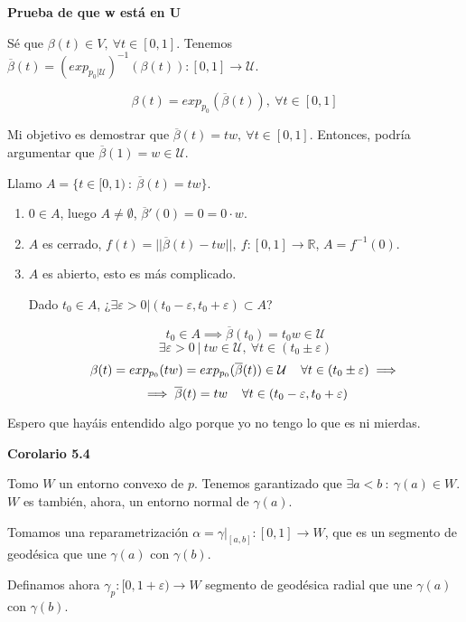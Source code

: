 \documentclass[openany]{book}
\begin{document}
\begin{demonstration}
  \begin{center}
  \textbf{Prueba de que w está en U}
  \end{center}

  Sé que $\beta (t) \in V, \ \forall t \in [0,1]$. Tenemos $\overline{\beta }(t) = \left( exp_{p_0 | \mathcal{U}} \right)^{-1} (\beta (t)) : [0,1] \to \mathcal{U}$.

  $$ \beta (t) = exp_{p_0}(\overline{\beta }(t)) , \ \forall t \in [0,1] $$

  Mi objetivo es demostrar que $\overline{\beta }(t) = tw, \ \forall t \in [0,1]$. Entonces, podría argumentar que $\overline{\beta }(1) = w \in \mathcal{U}$.

  Llamo $A= \{ t \in [0,1) \ : \  \overline{\beta }(t) = tw  \}$.
    \begin{enumerate}
      \item $0 \in A$, luego $A \ne \emptyset$, $\overline{\beta}'(0) = 0=0 \cdot w$.
      \item $A$ es cerrado, $f(t) = ||\overline{\beta }(t) - tw || , \ f:[0,1] \to \mathbb{R}$, $A= f ^{-1} (0)$.
      \item $A$ es abierto, esto es más complicado.

      Dado $t_0 \in A$, ¿$\exists \varepsilon >0 | (t_0 - \varepsilon , t_0 + \varepsilon ) \subset A$?

      $$ t_0 \in A \implies \overline{\beta }(t_0) = t_0 w \in \mathcal{U} $$
      $$ \exists \varepsilon >0 \ | \ tw \in \mathcal{U} , \ \forall t \in (t_0 \pm \varepsilon )$$
      $$ \beta (t) = exp_{p_0}(tw) = exp_{p_0}(\overline{\beta }(t))\in \mathcal{U} \hspace{0.4cm} \forall t \in (t_0 \pm \varepsilon ) \implies $$
      $$ \implies \overline{\beta }(t) = tw \hspace{0.4cm} \forall t \in (t_0 - \varepsilon , t_0 + \varepsilon )  $$
    \end{enumerate}
\end{demonstration}

Espero que hayáis entendido algo porque yo no tengo lo que es ni mierdas.

\begin{center}
\textbf{Corolario 5.4}
\end{center}
\begin{demonstration}
  Tomo $W$ un entorno convexo de $ p $. Tenemos garantizado que $\exists a<b \ : \ \gamma (a) \in W$. $W$ es también, ahora, un entorno normal de $\gamma (a)$.

  Tomamos una reparametrización $\alpha = \gamma |_{[a,b]}: [0,1] \to W$, que es un segmento de geodésica que une $\gamma (a)$ con $\gamma (b)$.

  Definamos ahora $\gamma _p: [0,1 + \varepsilon) \to W$ segmento de geodésica radial que une $\gamma (a)$ con $\gamma (b)$.
\end{demonstration}
\end{document}
